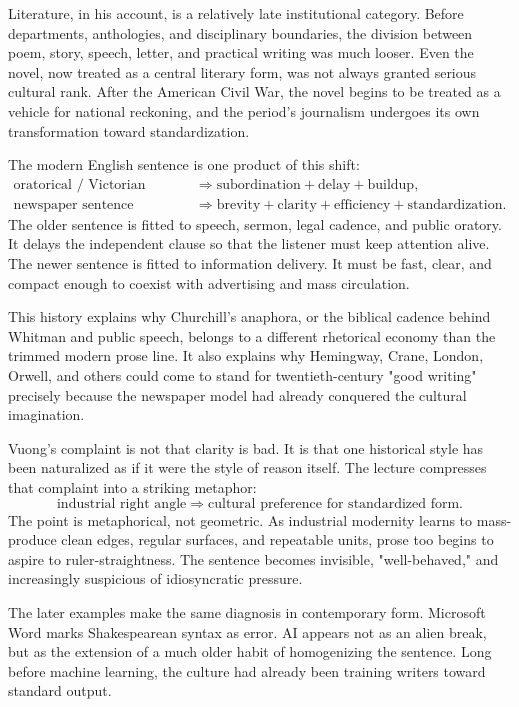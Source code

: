 Literature, in his account, is a relatively late institutional category. Before departments, anthologies, and disciplinary boundaries, the division between poem, story, speech, letter, and practical writing was much looser. Even the novel, now treated as a central literary form, was not always granted serious cultural rank. After the American Civil War, the novel begins to be treated as a vehicle for national reckoning, and the period's journalism undergoes its own transformation toward standardization.

The modern English sentence is one product of this shift:
\begin{align}
\text{oratorical / Victorian sentence} &\Longrightarrow \text{subordination} + \text{delay} + \text{buildup},\\
\text{newspaper sentence} &\Longrightarrow \text{brevity} + \text{clarity} + \text{efficiency} + \text{standardization}.
\end{align}
The older sentence is fitted to speech, sermon, legal cadence, and public oratory. It delays the independent clause so that the listener must keep attention alive. The newer sentence is fitted to information delivery. It must be fast, clear, and compact enough to coexist with advertising and mass circulation.

This history explains why Churchill's anaphora, or the biblical cadence behind Whitman and public speech, belongs to a different rhetorical economy than the trimmed modern prose line. It also explains why Hemingway, Crane, London, Orwell, and others could come to stand for twentieth-century "good writing" precisely because the newspaper model had already conquered the cultural imagination.

Vuong's complaint is not that clarity is bad. It is that one historical style has been naturalized as if it were the style of reason itself. The lecture compresses that complaint into a striking metaphor:
\begin{equation}
\text{industrial right angle} \Longrightarrow \text{cultural preference for standardized form}.
\end{equation}
The point is metaphorical, not geometric. As industrial modernity learns to mass-produce clean edges, regular surfaces, and repeatable units, prose too begins to aspire to ruler-straightness. The sentence becomes invisible, "well-behaved," and increasingly suspicious of idiosyncratic pressure.

The later examples make the same diagnosis in contemporary form. Microsoft Word marks Shakespearean syntax as error. AI appears not as an alien break, but as the extension of a much older habit of homogenizing the sentence. Long before machine learning, the culture had already been training writers toward standard output.

